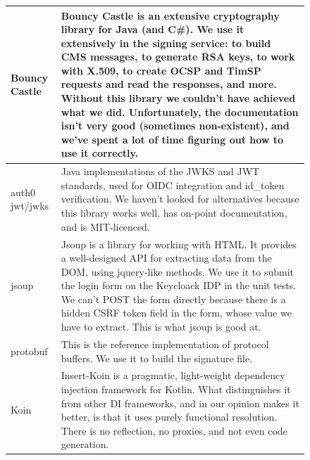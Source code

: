 \begin{figure}
\begin{center}
\begin{tabular}{p{3cm}|p{12cm}}
            \\ \hline
            Bouncy Castle &
            Bouncy Castle is an extensive cryptography library for Java (and C\#).
            We use it extensively in the signing service:
            to build \gls{CMS} messages,
            to generate \gls{RSA} keys,
            to work with X.509,
            to create \gls{OCSP} and \gls{TimSP} requests and read the responses,
            and more.
            Without this library we couldn't have achieved what we did.
            Unfortunately, the documentation isn't very good (sometimes non-existent),
            and we've spent a lot of time figuring out how to use it correctly.
            \\ \hline
            auth0 jwt/jwks &
            Java implementations of the \gls{JWKS} and \gls{JWT} standards,
            used for \gls{OIDC} integration and id\_token verification.
            We haven't looked for alternatives because this library works well,
            has on-point documentation, and is MIT-licenced.
            \\ \hline
            jsoup &
            Jsoup is a library for working with \gls{HTML}.
            It provides a well-designed \gls{API} for extracting data from the \gls{DOM},
            using jquery-like methods.
            We use it to submit the login form on the Keycloack \gls{IDP} in the unit tests.
            We can't POST the form directly because there is a hidden \gls{CSRF} token field in the form,
            whose value we have to extract.
            This is what jsoup is good at.
            \\ \hline
            protobuf &
            This is the reference implementation of protocol buffers.
            We use it to build the signature file.
            \\ \hline
            Koin &
            Insert-Koin is a pragmatic, light-weight dependency injection framework for Kotlin.
            What distinguishes it from other \gls{DI} frameworks,
            and in our opinion makes it better,
            is that it uses purely functional resolution.
            There is no reflection, no proxies, and not even code generation.
            \\
        \end{tabular}
    \end{center}
\end{figure}

